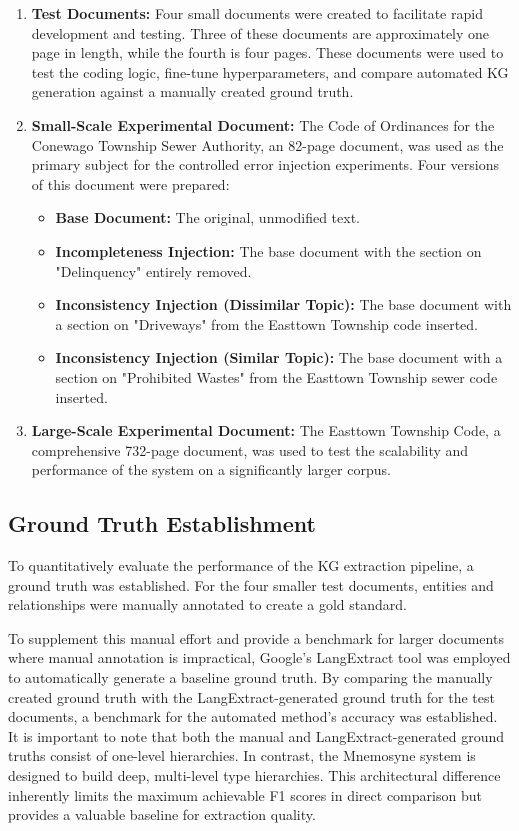 \begin{enumerate}
    \item \textbf{Test Documents:} Four small documents were created to facilitate rapid development and testing. Three of these documents are approximately one page in length, while the fourth is four pages. These documents were used to test the coding logic, fine-tune hyperparameters, and compare automated KG generation against a manually created ground truth.
    \item \textbf{Small-Scale Experimental Document:} The Code of Ordinances for the Conewago Township Sewer Authority, an 82-page document, was used as the primary subject for the controlled error injection experiments. Four versions of this document were prepared:
    \begin{itemize}
        \item \textbf{Base Document:} The original, unmodified text.
        \item \textbf{Incompleteness Injection:} The base document with the section on "Delinquency" entirely removed.
        \item \textbf{Inconsistency Injection (Dissimilar Topic):} The base document with a section on "Driveways" from the Easttown Township code inserted.
        \item \textbf{Inconsistency Injection (Similar Topic):} The base document with a section on "Prohibited Wastes" from the Easttown Township sewer code inserted.
    \end{itemize}
    \item \textbf{Large-Scale Experimental Document:} The Easttown Township Code, a comprehensive 732-page document, was used to test the scalability and performance of the system on a significantly larger corpus.
\end{enumerate}

\subsection{Ground Truth Establishment}
\label{subsec:ground_truth}
To quantitatively evaluate the performance of the KG extraction pipeline, a ground truth was established. For the four smaller test documents, entities and relationships were manually annotated to create a gold standard.

To supplement this manual effort and provide a benchmark for larger documents where manual annotation is impractical, Google's LangExtract tool was employed to automatically generate a baseline ground truth. By comparing the manually created ground truth with the LangExtract-generated ground truth for the test documents, a benchmark for the automated method's accuracy was established. It is important to note that both the manual and LangExtract-generated ground truths consist of one-level hierarchies. In contrast, the Mnemosyne system is designed to build deep, multi-level type hierarchies. This architectural difference inherently limits the maximum achievable F1 scores in direct comparison but provides a valuable baseline for extraction quality.

